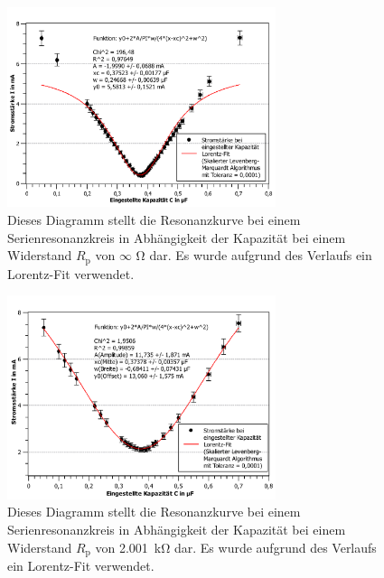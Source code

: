 	\begin{figure}[ht]
		\centering
		\includegraphics[width=0.7\textwidth]{auswertung/Parallel-infohm(algo).pdf}
		\caption{Dieses Diagramm stellt die Resonanzkurve bei einem Serienresonanzkreis in Abhängigkeit der Kapazität bei einem Widerstand $R_\text{p}$ von $\infty$ \si{\ohm} dar. Es wurde  aufgrund des Verlaufs ein Lorentz-Fit verwendet.}
		\label{fig:parallelinf}	
	\end{figure}
	\begin{figure}[ht]
		\centering
		\includegraphics[width=0.7\textwidth]{auswertung/Parallel-2kohm(algo).pdf}
		\caption{Dieses Diagramm stellt die Resonanzkurve bei einem Serienresonanzkreis in Abhängigkeit der Kapazität bei einem Widerstand $R_\text{p}$ von \SI{2,001}{\kilo\ohm} dar. Es wurde aufgrund des Verlaufs ein Lorentz-Fit verwendet.}
		\label{fig:parallel2k}	
	\end{figure}
